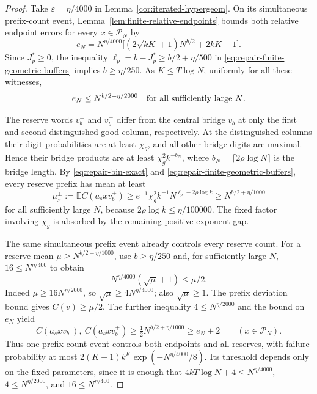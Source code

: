 \documentclass[11pt]{article}
\numberwithin{equation}{section}
\theoremstyle{definition}
\theoremstyle{remark}
\newcommand{\E}{\mathbb E}
\newcommand{\1}{\mathbf 1}
\begin{document}
\begin{proof}
Take \(\varepsilon=\eta/4000\) in
Lemma~\ref{cor:iterated-hypergeom}.  On its simultaneous
prefix-count event, Lemma~\ref{lem:finite-relative-endpoints} bounds
both relative endpoint errors for every \(x\in\mathcal P_N\)
by
\[
 e_N=N^{\eta/4000}
       \bigl[(2\sqrt{kK}+1)N^{b/2}+2kK+1\bigr].
\]
Since \(J_p^*\ge0\), the inequality
\(\ell_p=b-J_p^*\ge b/2+\eta/500\) in
\eqref{eq:repair-finite-geometric-buffers} implies \(b\ge\eta/250\).
As \(K\le T\log N\), uniformly for all these witnesses,
\begin{equation}
\label{eq:repair-endpoint-error-concrete}
 e_N\le N^{b/2+\eta/2000}
 \quad\hbox{for all sufficiently large \(N\)}.
\end{equation}

The reserve words \(v_b^-\) and \(v_b^+\) differ from the central
bridge \(v_b\) at only the first and second distinguished good
column, respectively.  At the distinguished columns their digit
probabilities are at least \(\chi_g\), and all other bridge digits
are maximal.  Hence their bridge products are at least
\(\chi_g^2k^{-b_N}\), where
\(b_N=\lceil 2\rho\log N\rceil\) is the bridge length.  By
\eqref{eq:repair-bin-exact} and
\eqref{eq:repair-finite-geometric-buffers}, every reserve prefix has
mean at least
\[
 \mu_x^\pm:=\E C(a_sxv_b^\pm)
 \ge e^{-1}\chi_g^2 k^{-1}
       N^{\ell_p-2\rho\log k}
 \ge N^{b/2+\eta/1000}
\]
for all sufficiently large \(N\), because
\(2\rho\log k\le\eta/100000\).  The fixed factor involving
\(\chi_g\) is absorbed by the remaining positive exponent gap.

The same simultaneous prefix event already controls every reserve count.
For a reserve mean $\mu\ge N^{b/2+\eta/1000}$, use $b\ge\eta/250$ and,
for sufficiently large $N$, $16\le N^{\eta/400}$ to obtain
\[
 N^{\eta/4000}(\sqrt\mu+1)\le\mu/2.
\]
Indeed $\mu\ge16N^{\eta/2000}$, so $\sqrt\mu\ge4N^{\eta/4000}$;
also $\sqrt\mu\ge1$. The prefix deviation bound gives $C(v)\ge\mu/2$.
The further inequality $4\le N^{\eta/2000}$ and the bound on $e_N$ yield
\begin{equation}\label{eq:repair-reserve-count-dominates}
 C(a_sxv_b^-),\ C(a_sxv_b^+)\ge\tfrac12N^{b/2+\eta/1000}
                           \ge e_N+2
 \qquad(x\in\mathcal P_N).
\end{equation}
Thus one prefix-count event controls both endpoints and all reserves,
with failure probability at most
$2(K+1)k^K\exp(-N^{\eta/4000}/8)$. Its threshold depends only on the
fixed parameters, since it is enough that
$4kT\log N+4\le N^{\eta/4000}$, $4\le N^{\eta/2000}$, and
$16\le N^{\eta/400}$.


\end{proof}
\end{document}
